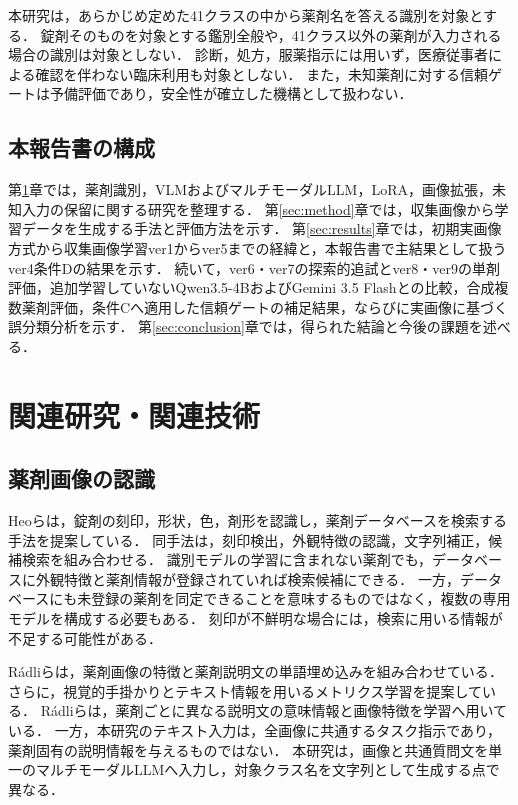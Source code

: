 \documentclass[uplatex,dvipdfmx]{jsarticle}
\begin{document}
本研究は，あらかじめ定めた41クラスの中から薬剤名を答える識別を対象とする．
錠剤そのものを対象とする鑑別全般や，41クラス以外の薬剤が入力される場合の識別は対象としない．
診断，処方，服薬指示には用いず，医療従事者による確認を伴わない臨床利用も対象としない．
また，未知薬剤に対する信頼ゲートは予備評価であり，安全性が確立した機構として扱わない．

\subsection{本報告書の構成}

第\ref{sec:related}章では，薬剤識別，VLMおよびマルチモーダルLLM，LoRA，画像拡張，未知入力の保留に関する研究を整理する．
第\ref{sec:method}章では，収集画像から学習データを生成する手法と評価方法を示す．
第\ref{sec:results}章では，初期実画像方式から収集画像学習ver1からver5までの経緯と，本報告書で主結果として扱うver4条件Dの結果を示す．
続いて，ver6・ver7の探索的追試とver8・ver9の単剤評価，追加学習していないQwen3.5-4BおよびGemini 3.5 Flashとの比較，合成複数薬剤評価，条件Cへ適用した信頼ゲートの補足結果，ならびに実画像に基づく誤分類分析を示す．
第\ref{sec:conclusion}章では，得られた結論と今後の課題を述べる．

\clearpage

\section{関連研究・関連技術}\label{sec:related}

\subsection{薬剤画像の認識}

Heoらは，錠剤の刻印，形状，色，剤形を認識し，薬剤データベースを検索する手法を提案している\cite{heo2023pill}．
同手法は，刻印検出，外観特徴の認識，文字列補正，候補検索を組み合わせる．
識別モデルの学習に含まれない薬剤でも，データベースに外観特徴と薬剤情報が登録されていれば検索候補にできる．
一方，データベースにも未登録の薬剤を同定できることを意味するものではなく，複数の専用モデルを構成する必要もある．
刻印が不鮮明な場合には，検索に用いる情報が不足する可能性がある．

Rádliらは，薬剤画像の特徴と薬剤説明文の単語埋め込みを組み合わせている\cite{radli2024word}．
さらに，視覚的手掛かりとテキスト情報を用いるメトリクス学習を提案している\cite{radli2024metric}．
Rádliらは，薬剤ごとに異なる説明文の意味情報と画像特徴を学習へ用いている．
一方，本研究のテキスト入力は，全画像に共通するタスク指示であり，薬剤固有の説明情報を与えるものではない．
本研究は，画像と共通質問文を単一のマルチモーダルLLMへ入力し，対象クラス名を文字列として生成する点で異なる．
\end{document}
